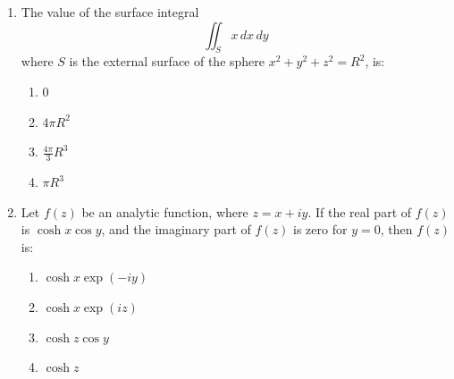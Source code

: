 \documentclass[journal,12pt,onecolumn]{IEEEtran}
\theoremstyle{remark}
\begin{document}
\begin{enumerate}
    \item The value of the surface integral
    \[
    \iint_S x \, dx \, dy
    \]
    where $S$ is the external surface of the sphere $x^2 + y^2 + z^2 = R^2$, is:
    \begin{enumerate}
        \item $0$
        \item $4 \pi R^2$
        \item $\frac{4 \pi}{3} R^3$
        \item $\pi R^3$
    \end{enumerate}

    \item Let $f(z)$ be an analytic function, where $z = x + i y$. If the real part of $f(z)$ is $\cosh x \cos y$, and the imaginary part of $f(z)$ is zero for $y = 0$, then $f(z)$ is:
    \begin{enumerate}
        \item $\cosh x \exp(-i y)$
        \item $\cosh x \exp(i z)$
        \item $\cosh z \cos y$
        \item $\cosh z$
    \end{enumerate}
    



\end{enumerate}
\end{document}
